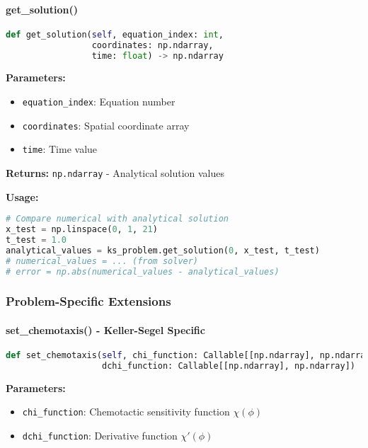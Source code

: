\paragraph{get\_solution()}
\begin{lstlisting}[language=Python, caption=Get Solution Method]
def get_solution(self, equation_index: int,
                 coordinates: np.ndarray,
                 time: float) -> np.ndarray
\end{lstlisting}

\textbf{Parameters:}
\begin{itemize}
    \item \texttt{equation\_index}: Equation number
    \item \texttt{coordinates}: Spatial coordinate array
    \item \texttt{time}: Time value
\end{itemize}

\textbf{Returns:} \texttt{np.ndarray} - Analytical solution values

\textbf{Usage:}
\begin{lstlisting}[language=Python]
# Compare numerical with analytical solution
x_test = np.linspace(0, 1, 21)
t_test = 1.0
analytical_values = ks_problem.get_solution(0, x_test, t_test)
# numerical_values = ... (from solver)
# error = np.abs(numerical_values - analytical_values)
\end{lstlisting}

\subsubsection{Problem-Specific Extensions}

\paragraph{set\_chemotaxis() - Keller-Segel Specific}
\begin{lstlisting}[language=Python, caption=Set Chemotaxis Functions]
def set_chemotaxis(self, chi_function: Callable[[np.ndarray], np.ndarray],
                   dchi_function: Callable[[np.ndarray], np.ndarray])
\end{lstlisting}

\textbf{Parameters:}
\begin{itemize}
    \item \texttt{chi\_function}: Chemotactic sensitivity function $\chi(\phi)$
    \item \texttt{dchi\_function}: Derivative function $\chi'(\phi)$
\end{itemize}

